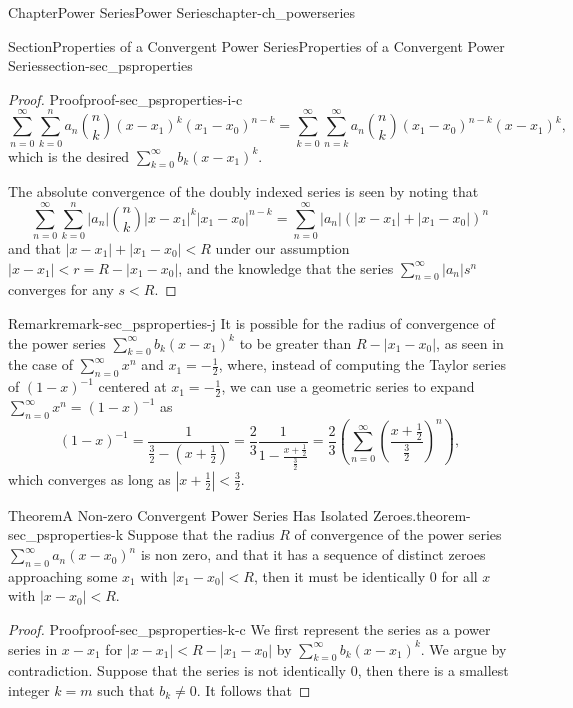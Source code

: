 \documentclass[oneside,10pt,]{book}
\numberwithin{equation}{section}
\newcommand{\lt}{<}
\begin{document}
\begin{chapterptx}{Chapter}{Power Series}{}{Power Series}{}{}{chapter-ch_powerseries}
\begin{sectionptx}{Section}{Properties of a Convergent Power Series}{}{Properties of a Convergent Power Series}{}{}{section-sec_psproperties}
\begin{proof}{Proof}{}{proof-sec_psproperties-i-c}
\begin{equation*}
\sum_{n=0}^{\infty}  \sum_{k=0}^{n}a_{n} \binom{n}{k} (x-x_{1})^{k}  (x_{1}-x_{0})^{n-k}
=\sum_{k=0}^{\infty}  \sum_{n=k}^{\infty} a_{n} \binom{n}{k} (x_{1}-x_{0})^{n-k} (x-x_{1})^{k},
\end{equation*}
which is the desired \(\sum_{k=0}^{\infty} b_{k}(x-x_{1})^{k}\).%
\par
The absolute convergence of the  doubly indexed series is seen by noting that%
\begin{equation*}
\sum_{n=0}^{\infty}  \sum_{k=0}^{n}|a_{n}| \binom{n}{k} |x-x_{1}|^{k}  |x_{1}-x_{0}|^{n-k}
=\sum_{n=0}^{\infty}|a_{n}| (|x-x_{1}| + |x_{1}-x_{0}|)^{n}
\end{equation*}
and that \(|x-x_{1}| + |x_{1}-x_{0}| \lt R\) under our assumption \(|x-x_{1}| \lt r=R- |x_{1}-x_{0}| \), and the knowledge that the series \(\sum_{n=0}^{\infty}|a_{n}| s^{n}\) converges for any \(s\lt R\).%
\end{proof}
\begin{remark}{Remark}{}{remark-sec_psproperties-j}%
It is possible for the radius of convergence of the power series \(\sum_{k=0}^{\infty} b_{k}(x-x_{1})^{k}\) to be greater than \(R-|x_{1}-x_{0}| \), as seen in the case of \(\sum_{n=0}^{\infty} x^{n}\) and \(x_{1}=-\frac 12\), where, instead of computing the Taylor series of \((1-x)^{-1}\) centered at \(x_{1}=-\frac 12\),  we can use a geometric series to expand \(\sum_{n=0}^{\infty} x^{n}=(1-x)^{-1}\) as%
\begin{equation*}
(1-x)^{-1}=\frac{1}{\frac 32 -(x+\frac{1}{2})}= \frac 23 \frac{1}{1- \frac{x+\frac{1}{2}}{\frac{3}{2}}}
=\frac 23 \left(\sum_{n=0}^{\infty}\left(\frac{x+\frac{1}{2}}{\frac{3}{2}} \right)^{n}\right),
\end{equation*}
which converges as long as \(|x+\frac{1}{2}| \lt \frac{3}{2}\).\end{remark}
\begin{theorem}{Theorem}{A Non-zero Convergent Power Series Has Isolated Zeroes.}{}{theorem-sec_psproperties-k}%
Suppose that the radius \(R\) of convergence of the power series \(\sum_{n=0}^{\infty} a_{n}(x-x_{0})^{n}\) is non zero, and that it has a sequence of distinct zeroes approaching some \(x_{1}\) with \(|x_{1}-x_{0}|\lt R\), then it must be identically \(0\) for all \(x\) with \(|x-x_{0}|\lt R\).\end{theorem}
\begin{proof}{Proof}{}{proof-sec_psproperties-k-c}
We first represent the series as a power series in \(x-x_{1}\) for \(|x-x_{1}|\lt R-|x_{1}-x_{0}|\) by \(\sum_{k=0}^{\infty} b_{k}(x-x_{1})^{k}\). We argue by contradiction. Suppose that the series is not identically \(0\), then there is a smallest integer  \(k=m\) such that  \(b_{k}\ne 0\). It follows that%

\end{proof}
\end{sectionptx}
\end{chapterptx}
\end{document}
